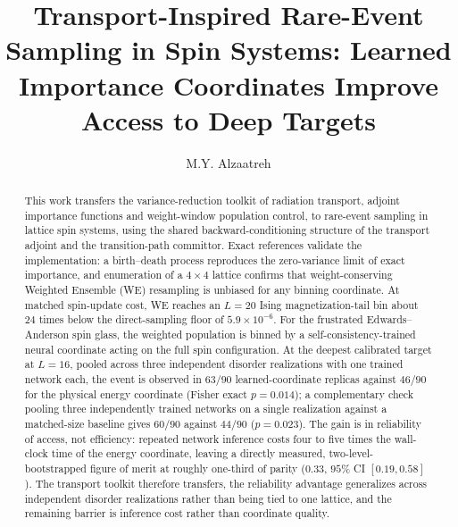 \documentclass[a4paper,fleqn]{cas-sc}
\begin{document}
\let\WriteBookmarks\relax
\def\floatpagepagefraction{1}
\def\textpagefraction{.001}


\title[mode=title]{Transport-Inspired Rare-Event Sampling in Spin Systems: Learned
Importance Coordinates Improve Access to Deep Targets}

\author{M.Y. Alzaatreh}
\cormark[1]



\begin{abstract}
This work transfers the variance-reduction toolkit of radiation transport, adjoint importance
functions and weight-window population control, to rare-event sampling in lattice spin systems,
using the shared backward-conditioning structure of the transport adjoint and the transition-path
committor. Exact references validate the implementation: a birth--death process reproduces the
zero-variance limit of exact importance, and enumeration of a $4\times4$ lattice confirms that
weight-conserving Weighted Ensemble (WE) resampling is unbiased for any binning coordinate. At
matched spin-update cost, WE reaches an $L=20$ Ising magnetization-tail bin about $24$ times below
the direct-sampling floor of $5.9\times10^{-6}$. For the frustrated Edwards--Anderson spin glass,
the weighted population is binned by a self-consistency-trained neural coordinate acting on the
full spin configuration. At the deepest calibrated target at $L=16$, pooled across three
independent disorder realizations with one trained network each, the event is observed in
$63/90$ learned-coordinate replicas against $46/90$ for the physical energy coordinate (Fisher
exact $p=0.014$); a complementary check pooling three independently trained networks on a single
realization against a matched-size baseline gives $60/90$ against $44/90$ ($p=0.023$). The gain
is in reliability of access, not efficiency: repeated network inference costs four to five times
the wall-clock time of the energy coordinate, leaving a directly measured, two-level-bootstrapped
figure of merit at roughly one-third of parity ($0.33$, $95\%$ CI $[0.19,0.58]$). The transport
toolkit therefore transfers, the reliability advantage generalizes across independent disorder
realizations rather than being tied to one lattice, and the remaining barrier is inference cost
rather than coordinate quality.
\end{abstract}
\end{document}
